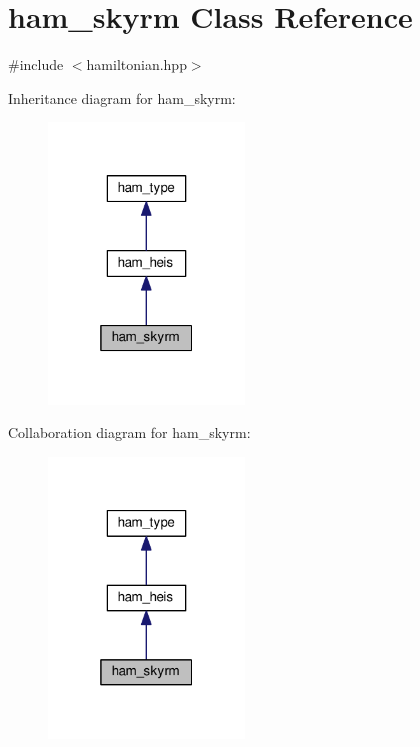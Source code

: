 \hypertarget{classham__skyrm}{}\section{ham\+\_\+skyrm Class Reference}
\label{classham__skyrm}


{\ttfamily \#include $<$hamiltonian.\+hpp$>$}



Inheritance diagram for ham\+\_\+skyrm\+:
\nopagebreak
\begin{figure}[H]
\begin{center}
\leavevmode
\includegraphics[width=148pt]{d0/d5b/classham__skyrm__inherit__graph}
\end{center}
\end{figure}


Collaboration diagram for ham\+\_\+skyrm\+:
\nopagebreak
\begin{figure}[H]
\begin{center}
\leavevmode
\includegraphics[width=148pt]{d6/d7d/classham__skyrm__coll__graph}
\end{center}
\end{figure}
